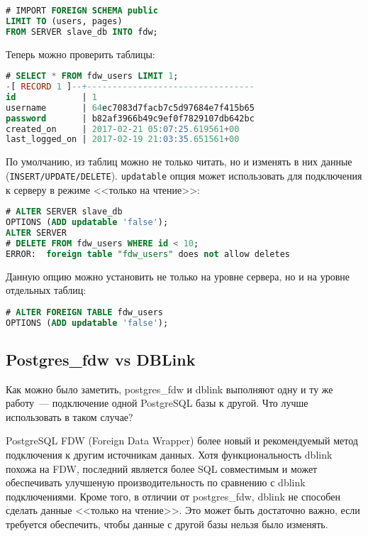 \begin{lstlisting}[language=SQL,label=lst:postgresfdw5,caption=Импортируем таблицы]
# IMPORT FOREIGN SCHEMA public
LIMIT TO (users, pages)
FROM SERVER slave_db INTO fdw;
\end{lstlisting}

Теперь можно проверить таблицы:

\begin{lstlisting}[language=SQL,label=lst:postgresfdw6,caption=SELECT]
# SELECT * FROM fdw_users LIMIT 1;
-[ RECORD 1 ]--+---------------------------------
id             | 1
username       | 64ec7083d7facb7c5d97684e7f415b65
password       | b82af3966b49c9ef0f7829107db642bc
created_on     | 2017-02-21 05:07:25.619561+00
last_logged_on | 2017-02-19 21:03:35.651561+00
\end{lstlisting}

По умолчанию, из таблиц можно не только читать, но и изменять в них данные (\lstinline!INSERT/UPDATE/DELETE!). \lstinline!updatable! опция может использовать для подключения к серверу в режиме <<только на чтение>>:

\begin{lstlisting}[language=SQL,label=lst:postgresfdw7,caption=Read-only mode]
# ALTER SERVER slave_db
OPTIONS (ADD updatable 'false');
ALTER SERVER
# DELETE FROM fdw_users WHERE id < 10;
ERROR:  foreign table "fdw_users" does not allow deletes
\end{lstlisting}

Данную опцию можно установить не только на уровне сервера, но и на уровне отдельных таблиц:

\begin{lstlisting}[language=SQL,label=lst:postgresfdw8,caption=Read-only mode для таблицы]
# ALTER FOREIGN TABLE fdw_users
OPTIONS (ADD updatable 'false');
\end{lstlisting}


\subsection{Postgres\_fdw vs DBLink}

Как можно было заметить, postgres\_fdw и dblink выполняют одну и ту же работу~--- подключение одной PostgreSQL базы к другой. Что лучше использовать в таком случае?

PostgreSQL FDW (Foreign Data Wrapper) более новый и рекомендуемый метод подключения к другим источникам данных. Хотя функциональность dblink похожа на FDW, последний является более SQL совместимым и может обеспечивать улучшеную производительность по сравнению с dblink подключениями. Кроме того, в отличии от postgres\_fdw, dblink не способен сделать данные <<только на чтение>>. Это может быть достаточно важно, если требуется обеспечить, чтобы данные с другой базы нельзя было изменять.

